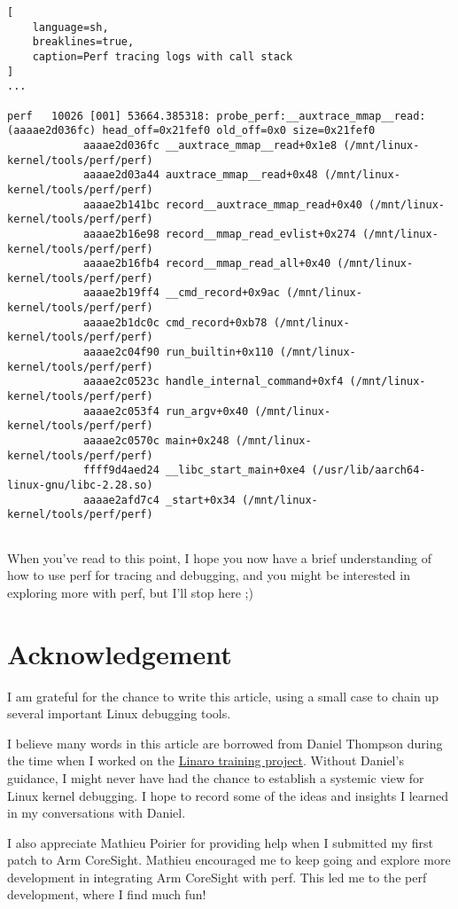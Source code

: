 \documentclass[11pt]{diazessay} %
\begin{document}
\begin{lstlisting}[
  	language=sh,
	breaklines=true,
	caption=Perf tracing logs with call stack
]
...

perf   10026 [001] 53664.385318: probe_perf:__auxtrace_mmap__read: (aaaae2d036fc) head_off=0x21fef0 old_off=0x0 size=0x21fef0
            aaaae2d036fc __auxtrace_mmap__read+0x1e8 (/mnt/linux-kernel/tools/perf/perf)
            aaaae2d03a44 auxtrace_mmap__read+0x48 (/mnt/linux-kernel/tools/perf/perf)
            aaaae2b141bc record__auxtrace_mmap_read+0x40 (/mnt/linux-kernel/tools/perf/perf)
            aaaae2b16e98 record__mmap_read_evlist+0x274 (/mnt/linux-kernel/tools/perf/perf)
            aaaae2b16fb4 record__mmap_read_all+0x40 (/mnt/linux-kernel/tools/perf/perf)
            aaaae2b19ff4 __cmd_record+0x9ac (/mnt/linux-kernel/tools/perf/perf)
            aaaae2b1dc0c cmd_record+0xb78 (/mnt/linux-kernel/tools/perf/perf)
            aaaae2c04f90 run_builtin+0x110 (/mnt/linux-kernel/tools/perf/perf)
            aaaae2c0523c handle_internal_command+0xf4 (/mnt/linux-kernel/tools/perf/perf)
            aaaae2c053f4 run_argv+0x40 (/mnt/linux-kernel/tools/perf/perf)
            aaaae2c0570c main+0x248 (/mnt/linux-kernel/tools/perf/perf)
            ffff9d4aed24 __libc_start_main+0xe4 (/usr/lib/aarch64-linux-gnu/libc-2.28.so)
            aaaae2afd7c4 _start+0x34 (/mnt/linux-kernel/tools/perf/perf)


\end{lstlisting}

When you've read to this point, I hope you now have a brief understanding
of how to use perf for tracing and debugging, and you might be interested
in exploring more with perf, but I'll stop here ;)

\section*{Acknowledgement}

I am grateful for the chance to write this article, using a small case to
chain up several important Linux debugging tools.

I believe many words in this article are borrowed from Daniel Thompson during
the time when I worked on the
\href{https://www.linaro.org/services/hands-on-training/}{Linaro training project}.
Without Daniel’s guidance, I might never have had the chance to establish a
systemic view for Linux kernel debugging. I hope to record some of the ideas and
insights I learned in my conversations with Daniel.

I also appreciate Mathieu Poirier for providing help when I submitted my first
patch to Arm CoreSight. Mathieu encouraged me to keep going and explore more
development in integrating Arm CoreSight with perf. This led me to the perf
development, where I find much fun!
\end{document}
